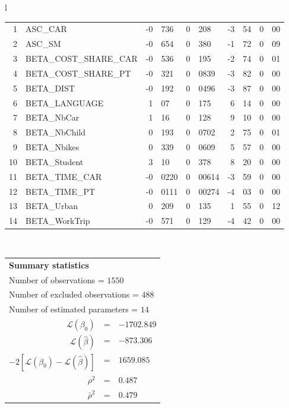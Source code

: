 \begin{tabular}{l}
\begin{tabular}{rlr@{.}lr@{.}lr@{.}lr@{.}l}
1 & ASC_CAR & -0&736 & 0&208 & -3&54 & 0&00\\
2 & ASC_SM & -0&654 & 0&380 & -1&72 & 0&09\\
3 & BETA_COST_SHARE_CAR & -0&536 & 0&195 & -2&74 & 0&01\\
4 & BETA_COST_SHARE_PT & -0&321 & 0&0839 & -3&82 & 0&00\\
5 & BETA_DIST & -0&192 & 0&0496 & -3&87 & 0&00\\
6 & BETA_LANGUAGE & 1&07 & 0&175 & 6&14 & 0&00\\
7 & BETA_NbCar & 1&16 & 0&128 & 9&10 & 0&00\\
8 & BETA_NbChild & 0&193 & 0&0702 & 2&75 & 0&01\\
9 & BETA_Nbikes & 0&339 & 0&0609 & 5&57 & 0&00\\
10 & BETA_Student & 3&10 & 0&378 & 8&20 & 0&00\\
11 & BETA_TIME_CAR & -0&0220 & 0&00614 & -3&59 & 0&00\\
12 & BETA_TIME_PT & -0&0111 & 0&00274 & -4&03 & 0&00\\
13 & BETA_Urban & 0&209 & 0&135 & 1&55 & 0&12\\
14 & BETA_WorkTrip & -0&571 & 0&129 & -4&42 & 0&00\\
\hline
\end{tabular}
\\
\begin{tabular}{rcl}
\multicolumn{3}{l}{\bf Summary statistics}\\
\multicolumn{3}{l}{ Number of observations = $1550$} \\
\multicolumn{3}{l}{ Number of excluded observations = $488$} \\
\multicolumn{3}{l}{ Number of estimated  parameters = $14$} \\
 $\mathcal{L}(\beta_0)$ &=&  $-1702.849$ \\
 $\mathcal{L}(\hat{\beta})$ &=& $-873.306 $  \\
 $-2[\mathcal{L}(\beta_0) -\mathcal{L}(\hat{\beta})]$ &=& $1659.085$ \\
    $\rho^2$ &=&   $0.487$ \\
    $\bar{\rho}^2$ &=&    $0.479$ \\
\end{tabular}
  \end{tabular}
